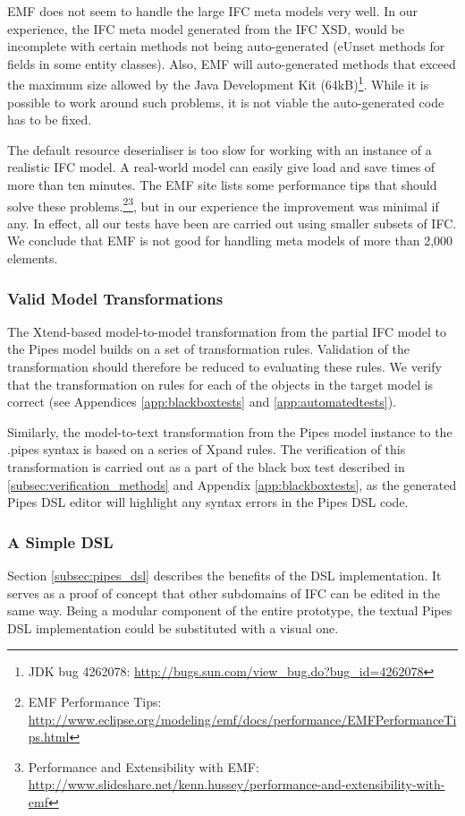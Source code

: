 EMF does not seem to handle the large IFC meta models very well. In our experience, the IFC meta model generated from the IFC XSD, would be incomplete with certain methods not being auto-generated (eUnset methods for fields in some entity classes). Also, EMF will auto-generated methods that exceed the maximum size allowed by the Java Development Kit (64kB)\footnote{JDK bug 4262078: \url{http://bugs.sun.com/view_bug.do?bug_id=4262078}}. While it is possible to work around such problems, it is not viable the auto-generated code has to be fixed.

The default resource deserialiser is too slow for working with an instance of a realistic IFC model. A real-world model can easily give load and save times of more than ten minutes. The EMF site lists some performance tips that should solve these problems.\footnote{EMF Performance Tips: \url{http://www.eclipse.org/modeling/emf/docs/performance/EMFPerformanceTips.html}}\footnote{Performance and Extensibility with EMF: \url{http://www.slideshare.net/kenn.hussey/performance-and-extensibility-with-emf}}, but in our experience the improvement was minimal if any. In effect, all our tests have been are carried out using smaller subsets of IFC. We conclude that EMF is not good for handling meta models of more than 2,000 elements.

\subsubsection{Valid Model Transformations} The Xtend-based model-to-model transformation from the partial IFC model to the Pipes model builds on a set of transformation rules. Validation of the transformation should therefore be reduced to evaluating these rules. We verify that the transformation on rules for each of the objects in the target model is correct (see Appendices \ref{app:blackboxtests} and \ref{app:automatedtests}).

Similarly, the model-to-text transformation from the Pipes model instance to the .pipes syntax is based on a series of Xpand rules. The verification of this transformation is carried out as a part of the black box test described in \ref{subsec:verification_methods} and Appendix \ref{app:blackboxtests}, as the generated Pipes DSL editor will highlight any syntax errors in the Pipes DSL code.

\subsubsection{A Simple DSL} Section \ref{subsec:pipes_dsl} describes the benefits of the DSL implementation. It serves as a proof of concept that other subdomains of IFC can be edited in the same way. Being a modular component of the entire prototype, the textual Pipes DSL implementation could be substituted with a visual one.


